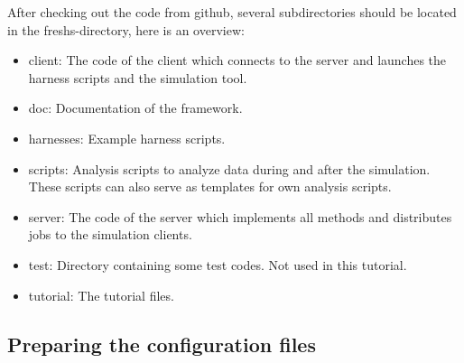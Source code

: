 \documentclass[a4paper,oneside]{article}
\begin{document}
After checking out the code from github, several subdirectories should be located in the freshs-directory, here is an overview:
\begin{itemize}
 \item client: The code of the client which connects to the server and launches the harness scripts and the simulation tool.
 \item doc: Documentation of the framework.
 \item harnesses: Example harness scripts.
 \item scripts: Analysis scripts to analyze data during and after the simulation. These scripts can also serve as templates for own analysis scripts.
 \item server: The code of the server which implements all methods and distributes jobs to the simulation clients.
 \item test: Directory containing some test codes. Not used in this tutorial.
 \item tutorial: The tutorial files.
\end{itemize}

\subsection{Preparing the configuration files}\label{sec:configfiles}
\end{document}
